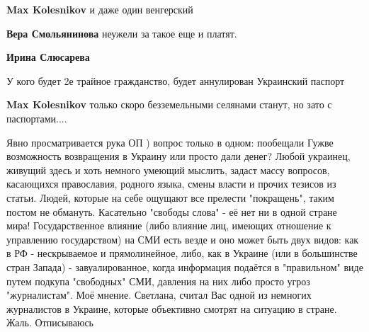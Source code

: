 \begin{itemize}
\begin{itemize}
\textbf{Max Kolesnikov} и даже один венгерский

 
\textbf{Вера Смольянинова} неужели за такое еще и платят.

 
\textbf{Ирина Слюсарева} 🤣🤣🤣

 
У кого будет 2е трайное гражданство, будет аннулирован Украинский паспорт

 
\textbf{Max Kolesnikov} только скоро безземельными селянами станут, но зато с паспортами....
\end{itemize}

 

Явно просматривается рука ОП ) вопрос только в одном: пообещали Гужве
возможность возвращения в Украину или просто дали денег? Любой украинец,
живущий здесь и хоть немного умеющий мыслить, задаст массу вопросов, касающихся
православия, родного языка, смены власти и прочих тезисов из статьи. Людей,
которые на себе ощущают все прелести "покращень", таким постом не обмануть.
Касательно "свободы слова" - её нет ни в одной стране мира! Государственное
влияние (либо влияние лиц, имеющих отношение к управлению государством) на СМИ
есть везде и оно может быть двух видов: как в РФ - нескрываемое и
прямолинейное, либо, как в Украине (или в большинстве стран Запада) -
завуалированное, когда информация подаётся в "правильном" виде путем подкупа
"свободных" СМИ, давления на них либо просто угроз "журналистам". Моё мнение.
Светлана, считал Вас одной из немногих журналистов в Украине, которые
объективно смотрят на ситуацию в стране. Жаль. Отписываюсь


\end{itemize}
